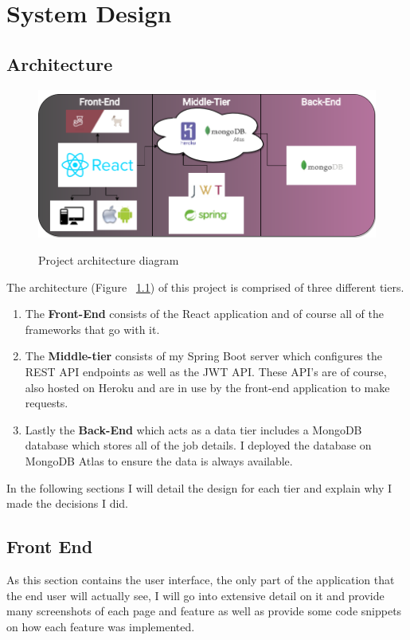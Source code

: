 \chapter{System Design}
\section{Architecture}

\begin{figure}[ht]
    \centering
    \includegraphics[scale=0.35]{Images/Project Architecture.png} 
    \label{proj_label}
    \caption{Project architecture diagram}
\end{figure}

The architecture (Figure ~\ref{proj_label}) of this project is comprised of three different tiers.
\begin{enumerate}
    \item The \textbf{Front-End} consists of the React application and of course all of the frameworks that go with it.
    \item The \textbf{Middle-tier} consists of my Spring Boot server which configures the REST API endpoints as well as the JWT API. These API's are of course, also hosted on Heroku and are in use by the front-end application to make requests.
    \item Lastly the \textbf{Back-End} which acts as a data tier includes a MongoDB database which stores all of the job details. I deployed the database on MongoDB Atlas to ensure the data is always available.
\end{enumerate}
In the following sections I will detail the design for each tier and explain why I made the decisions I did.

\section{Front End}
As this section contains the user interface, the only part of the application that the end user will actually see, I will go into extensive detail on it and provide many screenshots of each page and feature as well as provide some code snippets on how each feature was implemented.

